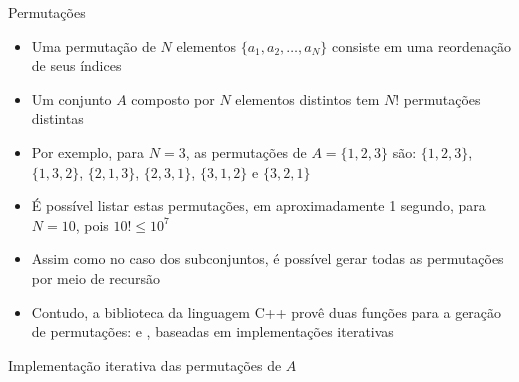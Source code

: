 \begin{frame}[fragile]{Permutações}

    \begin{itemize}
        \item Uma permutação de $N$ elementos $\lbrace a_1, a_2, \ldots, a_N\rbrace$ consiste
            em uma reordenação de seus índices 

        \item Um conjunto $A$ composto por $N$ elementos distintos tem $N!$ permutações distintas

        \item Por exemplo, para $N = 3$, as permutações de $A = \lbrace 1, 2, 3\rbrace$ são:
            $\lbrace 1, 2, 3\rbrace$, $\lbrace 1, 3, 2\rbrace$, $\lbrace 2, 1, 3\rbrace$,
            $\lbrace 2, 3, 1\rbrace$, $\lbrace 3, 1, 2\rbrace$ e $\lbrace 3, 2, 1\rbrace$

        \item É possível listar estas permutações, em aproximadamente 1 segundo, para
            $N = 10$, pois $10! \leq 10^7$

        \item Assim como no caso dos subconjuntos, é possível gerar todas as permutações por
            meio de recursão
        
        \item Contudo, a biblioteca  da linguagem C++ provê duas funções
            para a geração de permutações:  e
            , baseadas em implementações iterativas
    \end{itemize}

\end{frame}

\begin{frame}[fragile]{Implementação iterativa das permutações de $A$}
\end{frame}

